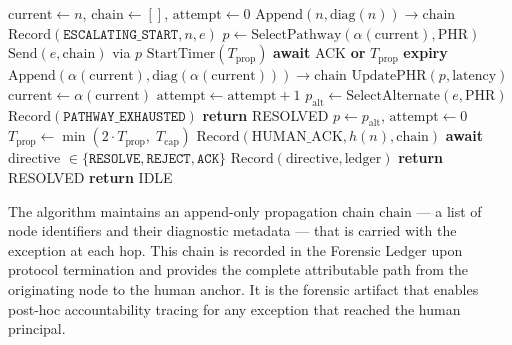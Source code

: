 \begin{algorithm}[htbp]
\caption{Escalation algorithm \texttt{Escalate}$(n, e)$}
\label{alg:escalate}
\begin{algorithmic}[1]
\State $\text{current} \leftarrow n$, $\text{chain} \leftarrow []$, $\text{attempt} \leftarrow 0$
\State $\text{Append}(n, \text{diag}(n)) \to \text{chain}$
\State $\text{Record}(\texttt{ESCALATING\_START}, n, e)$
    \State $p \leftarrow \text{SelectPathway}(\alpha(\text{current}), \text{PHR})$
    \State $\text{Send}(e, \text{chain})$ via $p$
    \State $\text{StartTimer}(T_{\text{prop}})$
    \State \textbf{await} ACK \textbf{or} $T_{\text{prop}}$ \textbf{expiry}
        \State $\text{Append}(\alpha(\text{current}), \text{diag}(\alpha(\text{current}))) \to \text{chain}$
        \State $\text{UpdatePHR}(p, \text{latency})$
        \State $\text{current} \leftarrow \alpha(\text{current})$
    \Else
        \State $\text{attempt} \leftarrow \text{attempt} + 1$
            \State $p_{\text{alt}} \leftarrow \text{SelectAlternate}(e, \text{PHR})$
                \State $\text{Record}(\texttt{PATHWAY\_EXHAUSTED})$
                \State \textbf{return} RESOLVED
            \EndIf
            \State $p \leftarrow p_{\text{alt}}$, $\text{attempt} \leftarrow 0$
        \Else
            \State $T_{\text{prop}} \leftarrow \min(2 \cdot T_{\text{prop}},\; T_{\text{cap}})$
        \EndIf
    \EndIf
\EndWhile
\State $\text{Record}(\text{HUMAN\_ACK}, h(n), \text{chain})$
\State \textbf{await} directive $\in \{\texttt{RESOLVE}, \texttt{REJECT}, \texttt{ACK}\}$
    \State $\text{Record}(\text{directive}, \text{ledger})$
    \State \textbf{return} RESOLVED
\Else
    \State \textbf{return} IDLE
\EndIf
\end{algorithmic}
\end{algorithm}

The algorithm maintains an append-only propagation chain $\text{chain}$ — a list of node identifiers and their diagnostic metadata — that is carried with the exception at each hop. This chain is recorded in the Forensic Ledger upon protocol termination and provides the complete attributable path from the originating node to the human anchor. It is the forensic artifact that enables post-hoc accountability tracing for any exception that reached the human principal.

